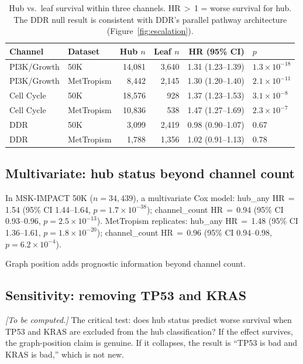 \documentclass[11pt]{article}
\begin{document}
\begin{table}[ht]
\centering
\caption{Hub vs.\ leaf survival within three channels.
HR\,$>$\,1 = worse survival for hub. The DDR null result is
consistent with DDR's parallel pathway architecture
(Figure~\ref{fig:escalation}).}
\label{tab:within-channel}
\begin{tabular}{@{}llrrrl@{}}
\toprule
Channel & Dataset & Hub $n$ & Leaf $n$ & HR (95\% CI) & $p$ \\
\midrule
PI3K/Growth & 50K & 14{,}081 & 3{,}640 & 1.31 (1.23--1.39) & $1.3 \times 10^{-18}$ \\
PI3K/Growth & MetTropism & 8{,}442 & 2{,}145 & 1.30 (1.20--1.40) & $2.1 \times 10^{-11}$ \\
Cell Cycle & 50K & 18{,}576 & 928 & 1.37 (1.23--1.53) & $3.1 \times 10^{-8}$ \\
Cell Cycle & MetTropism & 10{,}836 & 538 & 1.47 (1.27--1.69) & $2.3 \times 10^{-7}$ \\
DDR & 50K & 3{,}099 & 2{,}419 & 0.98 (0.90--1.07) & 0.67 \\
DDR & MetTropism & 1{,}788 & 1{,}356 & 1.02 (0.91--1.13) & 0.78 \\
\bottomrule
\end{tabular}
\end{table}

\subsection{Multivariate: hub status beyond channel count}

In MSK-IMPACT 50K ($n = 34{,}439$), a multivariate Cox model:
hub\_any HR\,$=$\,1.54 (95\% CI 1.44--1.64,
$p = 1.7 \times 10^{-38}$); channel\_count HR\,$=$\,0.94 (95\% CI
0.93--0.96, $p = 2.5 \times 10^{-13}$). MetTropism replicates:
hub\_any HR\,$=$\,1.48 (95\% CI 1.36--1.61,
$p = 1.8 \times 10^{-20}$); channel\_count HR\,$=$\,0.96 (95\% CI
0.94--0.98, $p = 6.2 \times 10^{-4}$).

Graph position adds prognostic information beyond channel count.

\subsection{Sensitivity: removing TP53 and KRAS}

\emph{[To be computed.]} The critical test: does hub status predict
worse survival when TP53 and KRAS are excluded from the hub
classification? If the effect survives, the graph-position claim is
genuine. If it collapses, the result is ``TP53 is bad and KRAS is
bad,'' which is not new.
\end{document}
